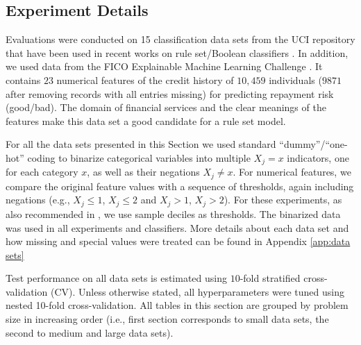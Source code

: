 \documentclass[twoside,11pt]{article}
\begin{document}
\subsection{Experiment Details} \label{sec:exp_details} %

Evaluations were conducted on 15 classification data sets from the UCI repository \citep{dua2017} that have been used in recent works on rule set/Boolean classifiers \citep{malioutov2013,dash2014,su2016,wang2017}.  In addition, we used data from the FICO Explainable Machine Learning Challenge \citep{FICO2018}.  It contains $23$ numerical features of the credit history of $10,459$ individuals ($9871$ after removing records with all entries missing) for predicting repayment risk (good/bad).  The domain of financial services and the clear meanings of the features make this data set a good candidate for a rule set model. 

For all the data sets presented in this Section we used standard “dummy”/“one-hot” coding to binarize categorical variables into multiple $X_j = x$ indicators, one for each category $x$, as well as their negations $X_j \neq x$. For numerical features, we compare the original feature values with a sequence of thresholds, again including negations (e.g., $X_j \leq 1$, $X_j \leq 2$ and $X_j > 1$, $X_j > 2$).  For these experiments, as also recommended in \cite{wang2017,su2016}, we use sample deciles as thresholds. The binarized data was used in all experiments and classifiers. More details about each data set and how missing and special values were treated can be found in Appendix \ref{app:data sets}  

Test performance on all data sets is estimated using $10$-fold stratified cross-validation (CV). Unless otherwise stated, all hyperparameters were tuned using nested 10-fold cross-validation. All tables in this section are grouped by problem size in increasing order (i.e., first section corresponds to small data sets, the second to medium and large data sets). 
\end{document}
